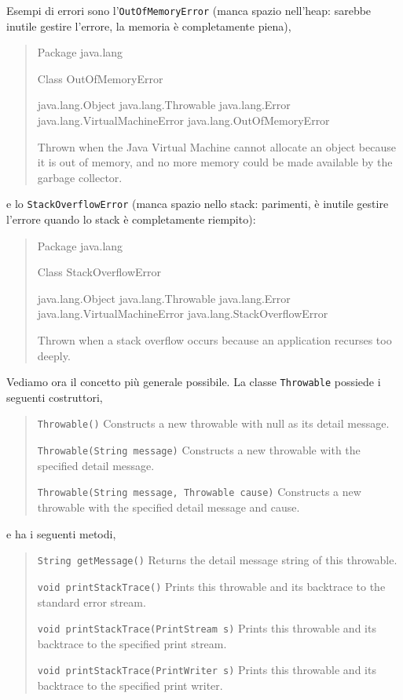 \documentclass[\fontsizeclass,twocolumn]{\classname}
\theoremstyle{definition}
\theoremstyle{definition}
\begin{document}
Esempi di errori sono l'\texttt{OutOfMemoryError} (manca spazio nell'heap: sarebbe inutile gestire l'errore, la memoria è completamente piena),
\begin{quote}
    \footnotesize{Package java.lang

Class OutOfMemoryError

java.lang.Object
java.lang.Throwable
java.lang.Error
java.lang.VirtualMachineError
java.lang.OutOfMemoryError

Thrown when the Java Virtual Machine cannot allocate an object because it is
out of memory, and no more memory could be made available by the garbage
collector.
}
\end{quote}
 e lo \texttt{StackOverflowError} (manca spazio nello stack: parimenti, è
 inutile gestire l'errore quando lo stack è completamente riempito):
\begin{quote}
    \footnotesize{Package java.lang

Class StackOverflowError

java.lang.Object
java.lang.Throwable
java.lang.Error
java.lang.VirtualMachineError
java.lang.StackOverflowError

Thrown when a stack overflow occurs because an application recurses too deeply.
}
\end{quote}

Vediamo ora il concetto più generale possibile.
La classe \texttt{Throwable} possiede i seguenti costruttori,

\begin{quote}
    \footnotesize{
        \texttt{Throwable()}	Constructs a new throwable with null as its detail message.

        \texttt{Throwable(String message)}	Constructs a new throwable with the specified detail message.

    \texttt{Throwable(String message, Throwable cause)}	Constructs a new throwable with the specified detail message and cause.}
\end{quote}

e ha i seguenti metodi,

\begin{quote}
    \footnotesize{\texttt{String	getMessage()}	Returns the detail message string of this throwable.

        \texttt{void	printStackTrace()}	Prints this throwable and its backtrace to the standard error stream.

        \texttt{void	printStackTrace(PrintStream s)}	Prints this throwable and its backtrace to the specified print stream.

    \texttt{void	printStackTrace(PrintWriter s)}	Prints this throwable and its backtrace to the specified print writer.}
\end{quote}
\end{document}
